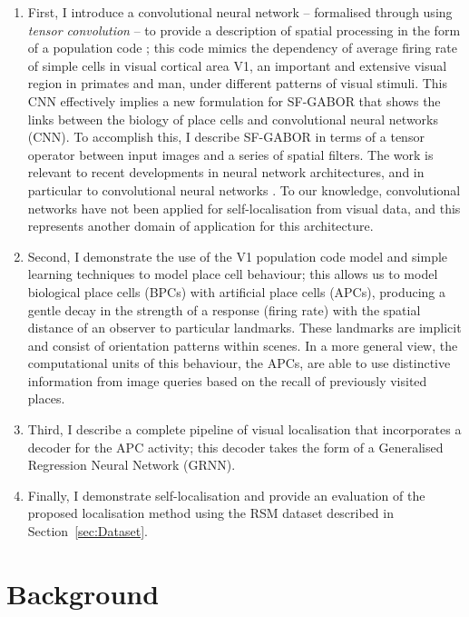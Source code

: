 \begin{enumerate}

\item First, I introduce a convolutional neural network -- formalised through using \textit{tensor convolution} -- to provide a description of spatial processing in the form of a population code \cite{berens2012fast}; this code mimics the dependency of average firing rate of simple cells in visual cortical area V1, an important and extensive visual region in primates and man, under different patterns of visual stimuli. This CNN effectively implies a new formulation for SF-GABOR that shows the links between the biology of place cells and convolutional neural networks (CNN). To accomplish this, I describe SF-GABOR in terms of a tensor operator between input images and a series of spatial filters.  The work is relevant to recent developments in neural network architectures, and in particular to convolutional neural networks \cite{krizhevsky2012imagenet, lecun1995convolutional}.  To our knowledge, convolutional networks have not been applied for self-localisation from visual data, and this represents another domain of application for this architecture.

\item Second, I demonstrate the use of the V1 population code model and simple learning techniques to model place cell behaviour; this allows us to model biological place cells (BPCs) with artificial place cells (APCs), producing a gentle decay in the strength of a response (firing rate) with the spatial distance of an observer to particular landmarks. These landmarks are implicit and consist of orientation patterns within scenes. In a more general view, the computational units of this behaviour, the APCs, are able to use distinctive information from image queries based on the recall of previously visited places. 

\item Third, I describe a complete pipeline of visual localisation that incorporates a decoder for the APC activity; this decoder takes the form of a Generalised Regression Neural Network (GRNN). 

\item Finally, I demonstrate self-localisation and provide an evaluation of the proposed localisation method using the RSM dataset described in Section~\ref{sec:Dataset}.

\end{enumerate}

\section{Background}

